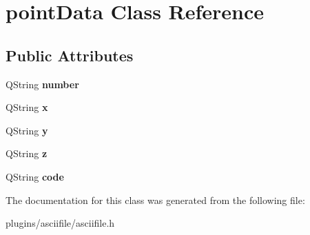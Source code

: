 \hypertarget{classpointData}{\section{point\-Data Class Reference}
\label{classpointData}
}
\subsection*{Public Attributes}
\begin{DoxyCompactItemize}
\item 
\hypertarget{classpointData_a4db341233e07e82021ab96e4e6de7854}{Q\-String {\bfseries number}}\label{classpointData_a4db341233e07e82021ab96e4e6de7854}

\item 
\hypertarget{classpointData_a6a69e60f66b36c9c6d211d7234fdb349}{Q\-String {\bfseries x}}\label{classpointData_a6a69e60f66b36c9c6d211d7234fdb349}

\item 
\hypertarget{classpointData_a65cfdc8cc588178546f6c79f84c21a39}{Q\-String {\bfseries y}}\label{classpointData_a65cfdc8cc588178546f6c79f84c21a39}

\item 
\hypertarget{classpointData_a288dcc4a78fbf30574aee85df5eaad0b}{Q\-String {\bfseries z}}\label{classpointData_a288dcc4a78fbf30574aee85df5eaad0b}

\item 
\hypertarget{classpointData_a5d33b45a3dc3541bebef804b4293d8f7}{Q\-String {\bfseries code}}\label{classpointData_a5d33b45a3dc3541bebef804b4293d8f7}

\end{DoxyCompactItemize}


The documentation for this class was generated from the following file\-:\begin{DoxyCompactItemize}
\item 
plugins/asciifile/asciifile.\-h\end{DoxyCompactItemize}
